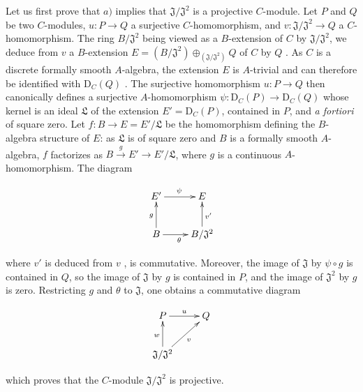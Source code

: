 \begin{env}[19.5.4.1]
\label{0.19.5.4.1}
Let us first prove that $a)$ implies that $\mathfrak{J}/\mathfrak{J}^2$ is a projective $C$-module.
Let $P$ and $Q$ be two $C$-modules, $u:P\to Q$ a surjective $C$-homomorphism, and $v:\mathfrak{J}/\mathfrak{J}^2\to Q$ a $C$-homomorphism.
The ring $B/\mathfrak{J}^2$ being viewed as a $B$-extension of $C$ by $\mathfrak{J}/\mathfrak{J}^2$, we deduce from $v$ a $B$-extension $E=(B/\mathfrak{J}^2)\oplus_{(\mathfrak{J}/\mathfrak{J}^2)}Q$ of $C$ by $Q$ .
As $C$ is a discrete formally smooth $A$-algebra, the extension $E$ is $A$-trivial  and can therefore be identified with $\mathrm{D}_C(Q)$ .
The surjective homomorphism $u:P\to Q$ then canonically defines a surjective $A$-homomorphism $\psi:\mathrm{D}_C(P)\to\mathrm{D}_C(Q)$  whose kernel is an ideal $\mathfrak{L}$ of the extension $E'=\mathrm{D}_C(P)$, contained in $P$, and \emph{a fortiori} of square zero.
Let $f:B\to E=E'/\mathfrak{L}$ be the homomorphism defining the $B$-algebra structure of $E$: as $\mathfrak{L}$ is of square zero and $B$ is a formally smooth $A$-algebra,
$f$ factorizes as $B\xrightarrow{g}E'\to E'/\mathfrak{L}$, where $g$ is a continuous $A$-homomorphism.
The diagram

\[
\xymatrix{
    E' \ar[r]^{\psi} & E \\
    B \ar[u]^{g} \ar[r]_{\theta} & B/\mathfrak{J}^2 \ar[u]_{v'}
  }
\]

where $v'$ is deduced from $v$ , is commutative.
Moreover, the image of $\mathfrak{J}$ by $\psi\circ g$ is contained in $Q$, so the image of $\mathfrak{J}$ by $g$ is contained in $P$, and the image of $\mathfrak{J}^2$ by $g$ is zero.
Restricting $g$ and $\theta$ to $\mathfrak{J}$, one obtains a commutative diagram

\[
\xymatrix{
    P \ar[r]^{u} & Q \\
    \mathfrak{J}/\mathfrak{J}^2 \ar[u]^{w} \ar[ur]_{v}
  }
\]

which proves that the $C$-module $\mathfrak{J}/\mathfrak{J}^2$ is projective.
\end{env}

